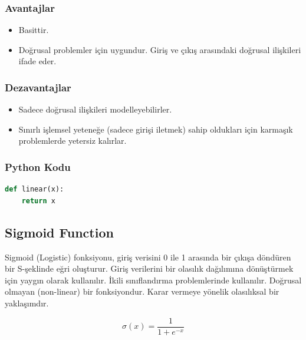 \subsubsection{Avantajlar}
\begin{itemize}
    \item Basittir.
    \item Doğrusal problemler için uygundur. Giriş ve çıkış arasındaki doğrusal ilişkileri ifade eder.
\end{itemize}

\subsubsection{Dezavantajlar}
\begin{itemize}
    \item Sadece doğrusal ilişkileri modelleyebilirler.
    \item Sınırlı işlemsel yeteneğe (sadece girişi iletmek) sahip oldukları için karmaşık problemlerde yetersiz kalırlar.
\end{itemize}

\subsubsection{Python Kodu}

\begin{lstlisting}[language=Python]
def linear(x):
    return x
\end{lstlisting}

\newpage

\subsection{Sigmoid Function}
Sigmoid (Logistic) fonksiyonu, giriş verisini 0 ile 1 arasında bir çıkışa döndüren bir S-şeklinde eğri oluşturur. Giriş verilerini bir olasılık dağılımına dönüştürmek için yaygın olarak kullanılır. İkili sınıflandırma problemlerinde kullanılır. Doğrusal olmayan (non-linear) bir fonksiyondur. Karar vermeye yönelik olasılıksal bir yaklaşımdır.

\[\sigma(x) = \frac{1}{1 + e^{-x}}\]

